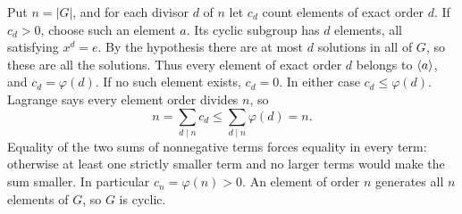 Put $n=|G|$, and for each divisor $d$ of $n$ let $c_d$ count elements of exact order $d$. If $c_d>0$, choose such an element $a$. Its cyclic subgroup has $d$ elements, all satisfying $x^d=e$. By the hypothesis there are at most $d$ solutions in all of $G$, so these are all the solutions. Thus every element of exact order $d$ belongs to $\langle a\rangle$, and $c_d=\varphi(d)$. If no such element exists, $c_d=0$. In either case $c_d\le\varphi(d)$.
Lagrange says every element order divides $n$, so
\[n=\sum_{d\mid n}c_d\le\sum_{d\mid n}\varphi(d)=n.\]
Equality of the two sums of nonnegative terms forces equality in every term: otherwise at least one strictly smaller term and no larger terms would make the sum smaller. In particular $c_n=\varphi(n)>0$. An element of order $n$ generates all $n$ elements of $G$, so $G$ is cyclic.
